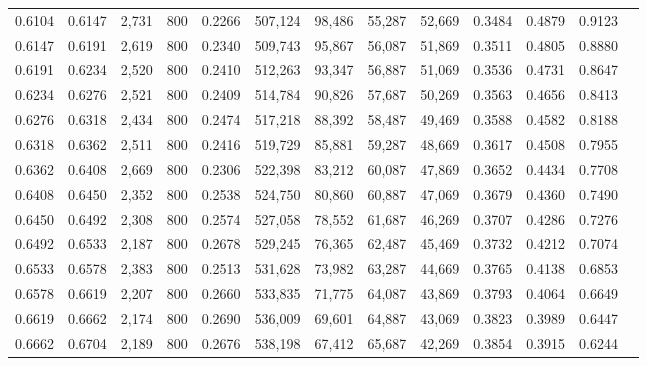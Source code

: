 \begin{tabular}{rrrrrrrrrrrrr}
0.6104 & 0.6147 &  2,731 &   800 &                                     0.2266 & 507,124 &  98,486 &  55,287 &  52,669 & 0.3484 & 0.4879 & 0.9123 \\
0.6147 & 0.6191 &  2,619 &   800 &                                     0.2340 & 509,743 &  95,867 &  56,087 &  51,869 & 0.3511 & 0.4805 & 0.8880 \\
0.6191 & 0.6234 &  2,520 &   800 &                                     0.2410 & 512,263 &  93,347 &  56,887 &  51,069 & 0.3536 & 0.4731 & 0.8647 \\
0.6234 & 0.6276 &  2,521 &   800 &                                     0.2409 & 514,784 &  90,826 &  57,687 &  50,269 & 0.3563 & 0.4656 & 0.8413 \\
0.6276 & 0.6318 &  2,434 &   800 &                                     0.2474 & 517,218 &  88,392 &  58,487 &  49,469 & 0.3588 & 0.4582 & 0.8188 \\
0.6318 & 0.6362 &  2,511 &   800 &                                     0.2416 & 519,729 &  85,881 &  59,287 &  48,669 & 0.3617 & 0.4508 & 0.7955 \\
0.6362 & 0.6408 &  2,669 &   800 &                                     0.2306 & 522,398 &  83,212 &  60,087 &  47,869 & 0.3652 & 0.4434 & 0.7708 \\
0.6408 & 0.6450 &  2,352 &   800 &                                     0.2538 & 524,750 &  80,860 &  60,887 &  47,069 & 0.3679 & 0.4360 & 0.7490 \\
0.6450 & 0.6492 &  2,308 &   800 &                                     0.2574 & 527,058 &  78,552 &  61,687 &  46,269 & 0.3707 & 0.4286 & 0.7276 \\
0.6492 & 0.6533 &  2,187 &   800 &                                     0.2678 & 529,245 &  76,365 &  62,487 &  45,469 & 0.3732 & 0.4212 & 0.7074 \\
0.6533 & 0.6578 &  2,383 &   800 &                                     0.2513 & 531,628 &  73,982 &  63,287 &  44,669 & 0.3765 & 0.4138 & 0.6853 \\
0.6578 & 0.6619 &  2,207 &   800 &                                     0.2660 & 533,835 &  71,775 &  64,087 &  43,869 & 0.3793 & 0.4064 & 0.6649 \\
0.6619 & 0.6662 &  2,174 &   800 &                                     0.2690 & 536,009 &  69,601 &  64,887 &  43,069 & 0.3823 & 0.3989 & 0.6447 \\
0.6662 & 0.6704 &  2,189 &   800 &                                     0.2676 & 538,198 &  67,412 &  65,687 &  42,269 & 0.3854 & 0.3915 & 0.6244 \\

\end{tabular}
